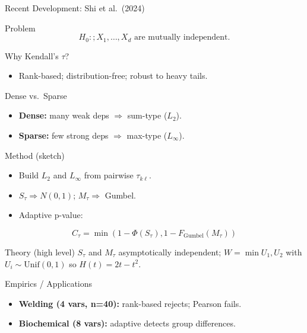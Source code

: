 \documentclass[
  ignorenonframetext,
]{beamer}
\providecommand{\tightlist}{%
  \setlength{\itemsep}{0pt}\setlength{\parskip}{0pt}}
\begin{document}
\begin{frame}[allowframebreaks]{Recent Development: Shi et al.~(2024)}
\label{recent-development-shi-et-al.-2024}
\begin{block}{Problem}
\label{problem}
\[
H_0:; X_1,\dots,X_d \text{ are mutually independent.}
\]
\end{block}

\begin{block}{Why Kendall's \(\tau\)?}
\label{why-kendalls-tau}
\begin{itemize}
\tightlist
\item
  Rank-based; distribution-free; robust to heavy tails.
\end{itemize}
\end{block}

\begin{block}{Dense vs.~Sparse}
\label{dense-vs.-sparse}
\begin{itemize}
\tightlist
\item
  \textbf{Dense:} many weak deps \(\Rightarrow\) sum-type (\(L_2\)).
\item
  \textbf{Sparse:} few strong deps \(\Rightarrow\) max-type
  (\(L_\infty\)).
\end{itemize}
\end{block}

\begin{block}{Method (sketch)}
\label{method-sketch}
\begin{itemize}
\tightlist
\item
  Build \(L_2\) and \(L_\infty\) from pairwise \(\tau_{k\ell}\).
\item
  \(S_\tau \Rightarrow N(0,1)\); \(M_\tau \Rightarrow\) Gumbel.
\item
  Adaptive p-value:
\end{itemize}

\[
C_\tau=\min{(1-\Phi(S_\tau), 1-F_{\mathrm{Gumbel}}(M_\tau))}
\]
\end{block}

\begin{block}{Theory (high level)}
\label{theory-high-level}
\(S_\tau\) and \(M_\tau\) asymptotically independent;
\(W=\min{U_1,U_2}\) with \(U_i\sim \mathrm{Unif}(0,1)\) so
\(H(t)=2t-t^2\).
\end{block}

\begin{block}{Empirics / Applications}
\label{empirics-applications}
\begin{itemize}
\tightlist
\item
  \textbf{Welding (4 vars, n=40):} rank-based rejects; Pearson fails.
\item
  \textbf{Biochemical (8 vars):} adaptive detects group differences.
\end{itemize}
\end{block}
\end{frame}
\end{document}
